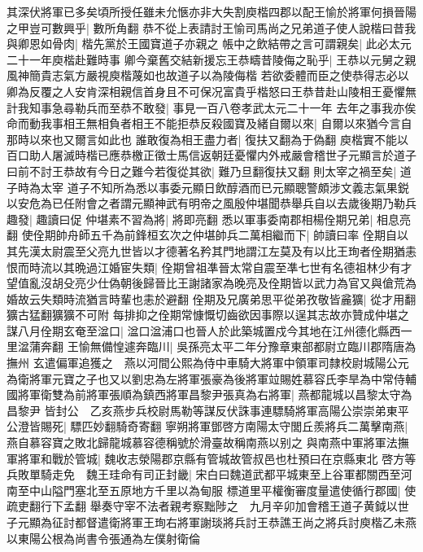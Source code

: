其深伏將軍已多矣頃所授任雖未允愜亦非大失割庾楷四郡以配王愉於將軍何損晉陽之甲豈可數興乎|{
	數所角翻}
恭不從上表請討王愉司馬尚之兄弟道子使人說楷曰昔我與卿恩如骨肉|{
	楷先黨於王國寶道子亦親之}
帳中之飲結帶之言可謂親矣|{
	此必太元二十一年庾楷赴難時事}
卿今棄舊交結新援忘王恭疇昔陵侮之恥乎|{
	王恭以元舅之親風神簡貴志氣方嚴視庾楷蔑如也故道子以為陵侮楷}
若欲委體而臣之使恭得志必以卿為反覆之人安肯深相親信首身且不可保况富貴乎楷怒曰王恭昔赴山陵相王憂懼無計我知事急尋勒兵而至恭不敢發|{
	事見一百八卷孝武太元二十一年}
去年之事我亦俟命而動我事相王無相負者相王不能拒恭反殺國寶及緒自爾以來|{
	自爾以來猶今言自那時以來也又爾言如此也}
誰敢復為相王盡力者|{
	復扶又翻為于偽翻}
庾楷實不能以百口助人屠滅時楷已應恭檄正徵士馬信返朝廷憂懼内外戒嚴會稽世子元顯言於道子曰前不討王恭故有今日之難今若復從其欲|{
	難乃旦翻復扶又翻}
則太宰之禍至矣|{
	道子時為太宰}
道子不知所為悉以事委元顯日飲醇酒而已元顯聰警頗涉文義志氣果鋭以安危為已任附會之者謂元顯神武有明帝之風殷仲堪聞恭舉兵自以去歲後期乃勒兵趣發|{
	趣讀曰促}
仲堪素不習為將|{
	將即亮翻}
悉以軍事委南郡相楊佺期兄弟|{
	相息亮翻}
使佺期帥舟師五千為前鋒桓玄次之仲堪帥兵二萬相繼而下|{
	帥讀曰率}
佺期自以其先漢太尉震至父亮九世皆以才德著名矜其門地謂江左莫及有以比王珣者佺期猶恚恨而時流以其晩過江婚宦失類|{
	佺期曾祖凖晉太常自震至凖七世有名德祖林少有才望值亂沒胡殳亮少仕偽朝後歸晉比王謝諸家為晚亮及佺期皆以武力為官又與傖荒為婚故云失類時流猶言時輩也恚於避翻}
佺期及兄廣弟思平從弟孜敬皆麄獷|{
	從才用翻獷古猛翻獷獷不可附}
每排抑之佺期常慷慨切齒欲因事際以逞其志故亦贊成仲堪之謀八月佺期玄奄至湓口|{
	湓口湓浦口也晉人於此築城置戍今其地在江州德化縣西一里湓蒲奔翻}
王愉無備惶遽奔臨川|{
	吳孫亮太平二年分豫章東部都尉立臨川郡隋唐為撫州}
玄遣偏軍追獲之　燕以河間公熙為侍中車騎大將軍中領軍司隸校尉城陽公元為衛將軍元寶之子也又以劉忠為左將軍張豪為後將軍竝賜姓慕容氏李旱為中常侍輔國將軍衛雙為前將軍張順為鎮西將軍昌黎尹張真為右將軍|{
	燕都龍城以昌黎太守為昌黎尹}
皆封公　乙亥燕步兵校尉馬勒等謀反伏誅事連驃騎將軍高陽公崇崇弟東平公澄皆賜死|{
	驃匹妙翻騎奇寄翻}
寧朔將軍鄧啓方南陽太守閭丘羨將兵二萬擊南燕|{
	燕自慕容寶之敗北歸龍城慕容德稱號於滑臺故稱南燕以别之}
與南燕中軍將軍法撫軍將軍和戰於管城|{
	魏收志滎陽郡京縣有管城故管叔邑也杜預曰在京縣東北}
啓方等兵敗單騎走免　魏王珪命有司正封畿|{
	宋白曰魏道武都平城東至上谷軍都關西至河南至中山隘門塞北至五原地方千里以為甸服}
標道里平權衡審度量遣使循行郡國|{
	使疏吏翻行下孟翻}
舉奏守宰不法者親考察黜陟之　九月辛卯加會稽王道子黄鉞以世子元顯為征討都督遣衛將軍王珣右將軍謝琰將兵討王恭譙王尚之將兵討庾楷乙未燕以東陽公根為尚書令張通為左僕射衛倫

